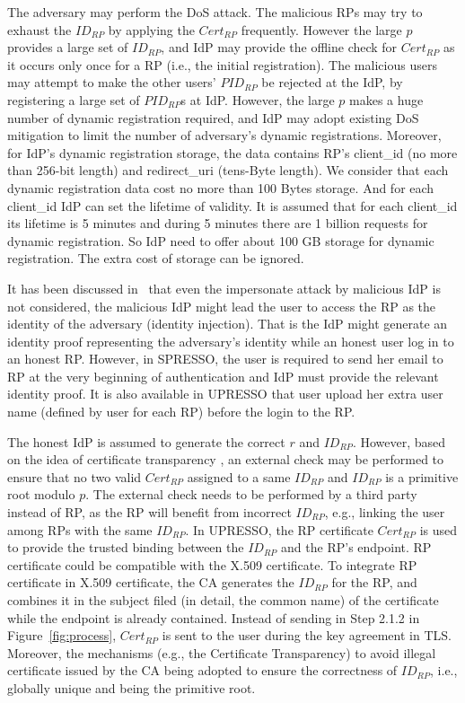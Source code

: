  The adversary may perform the DoS attack. The malicious RPs may try to exhaust the $ID_{RP}$  by applying the $Cert_{RP}$ frequently. However the large $p$ provides a large set of $ID_{RP}$, and IdP may provide the offline check for $Cert_{RP}$ as it occurs only once for a RP (i.e., the initial registration). The malicious users may attempt to make the other users' $PID_{RP}$ be rejected at the IdP, by registering a large set of $PID_{RP}$s at IdP. However, the large $p$ makes a huge number of dynamic registration required, and IdP may adopt existing DoS mitigation to limit the number of adversary's dynamic registrations. Moreover, for IdP's dynamic registration storage, the data contains RP's client\_id (no more than 256-bit length) and redirect\_uri (tens-Byte length). We consider that each dynamic registration data cost no more than 100 Bytes storage. And for each client\_id IdP can set the lifetime of validity. It is assumed that for each client\_id its lifetime is 5 minutes and during 5 minutes there are 1 billion requests for dynamic registration. So IdP need to offer about 100 GB storage for dynamic registration. The extra cost of storage can be ignored.

 It has been discussed in~\cite{SPRESSO} that even the impersonate attack by malicious IdP is not considered, the malicious IdP might lead the user to access the RP as the identity of the adversary (identity injection). That is the IdP might generate an identity proof representing the adversary's identity while an honest user log in to an honest RP. However, in SPRESSO, the user is required to send her email to RP at the very beginning of authentication and IdP must provide the relevant identity proof. It is also available in UPRESSO that user upload her extra user name (defined by user for each RP) before the login to the RP.

 The honest IdP is assumed to generate the correct $r$ and $ID_{RP}$.
However, based on the idea of certificate transparency \cite{rfc6962},
an external check may be performed to ensure that  no two valid $Cert_{RP}$ assigned to a same $ID_{RP}$ and $ID_{RP}$ is a primitive root modulo $p$.
The external check needs to be performed by a third party instead of RP, as the RP will benefit from incorrect $ID_{RP}$, e.g., linking the user among RPs with the same  $ID_{RP}$.
In UPRESSO, the RP certificate $Cert_{RP}$ is used to provide the trusted binding between the $ID_{RP}$ and the RP's endpoint. RP certificate could be compatible with the X.509 certificate. To integrate RP certificate in X.509 certificate, the CA generates the $ID_{RP}$ for the RP, and combines it in the subject  filed (in detail, the common name)  of the certificate while the endpoint is already contained. Instead of sending  in Step 2.1.2 in Figure~\ref{fig:process}, $Cert_{RP}$  is sent to the user during the key agreement in TLS. Moreover, the mechanisms (e.g., the Certificate Transparency) to avoid illegal certificate issued by the CA being adopted to ensure the correctness of $ID_{RP}$, i.e., globally unique and being the primitive root.



